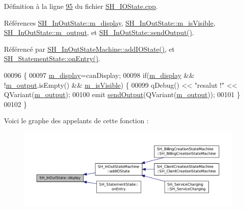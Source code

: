 Définition à la ligne \hyperlink{SH__IOState_8cpp_source_l00095}{95} du fichier \hyperlink{SH__IOState_8cpp_source}{S\-H\-\_\-\-I\-O\-State.\-cpp}.



Références \hyperlink{classSH__InOutState_a3351fa53593266a1ae4334d33d0b1610}{S\-H\-\_\-\-In\-Out\-State\-::m\-\_\-display}, \hyperlink{classSH__InOutState_a8fd66b185c9a55f0e84daa97e2acf53a}{S\-H\-\_\-\-In\-Out\-State\-::m\-\_\-is\-Visible}, \hyperlink{classSH__InOutState_ae735e741ce229d2600448d8daa0abc2d}{S\-H\-\_\-\-In\-Out\-State\-::m\-\_\-output}, et \hyperlink{classSH__InOutState_ad40e929a5537eb1d4883d5aa6eee5b15}{S\-H\-\_\-\-In\-Out\-State\-::send\-Output()}.



Référencé par \hyperlink{classSH__InOutStateMachine_ad6b778d052f741daee720c047059ce0e}{S\-H\-\_\-\-In\-Out\-State\-Machine\-::add\-I\-O\-State()}, et \hyperlink{classSH__StatementState_ac62f9c27b2966034e56762a6e532dbe4}{S\-H\-\_\-\-Statement\-State\-::on\-Entry()}.


\begin{DoxyCode}
00096 \{
00097     \hyperlink{classSH__InOutState_a3351fa53593266a1ae4334d33d0b1610}{m\_display}=canDisplay;
00098     \textcolor{keywordflow}{if}(\hyperlink{classSH__InOutState_a3351fa53593266a1ae4334d33d0b1610}{m\_display} && !\hyperlink{classSH__InOutState_ae735e741ce229d2600448d8daa0abc2d}{m\_output}.isEmpty() && \hyperlink{classSH__InOutState_a8fd66b185c9a55f0e84daa97e2acf53a}{m\_isVisible}) \{
00099         qDebug() << \textcolor{stringliteral}{"resalut !"} << QVariant(\hyperlink{classSH__InOutState_ae735e741ce229d2600448d8daa0abc2d}{m\_output});
00100         emit \hyperlink{classSH__InOutState_ad40e929a5537eb1d4883d5aa6eee5b15}{sendOutput}(QVariant(\hyperlink{classSH__InOutState_ae735e741ce229d2600448d8daa0abc2d}{m\_output}));
00101     \}
00102 \}
\end{DoxyCode}


Voici le graphe des appelants de cette fonction \-:\nopagebreak
\begin{figure}[H]
\begin{center}
\leavevmode
\includegraphics[width=350pt]{classSH__InOutState_a918e8a7f5fe00dc16004e46eeee1281d_icgraph}
\end{center}
\end{figure}


